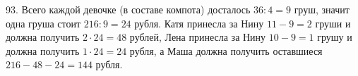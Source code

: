 93. Всего каждой девочке (в составе компота) досталось $36:4=9$ груш, значит одна груша стоит $216:9=24$ рубля. Катя принесла за Нину $11-9=2$ груши и должна получить $2\cdot24=48$ рублей, Лена принесла за Нину $10-9=1$ грушу и должна получить $1\cdot24=24$ рубля, а Маша должна получить оставшиеся $216-48-24=144$ рубля.\\
